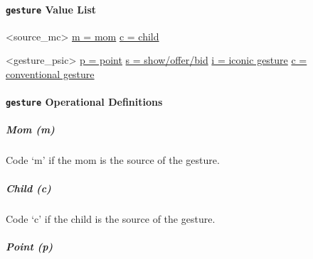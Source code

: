 \documentclass[
  12pt,
]{book}
\begin{document}
\hypertarget{gesture_value_list}{%
\paragraph*{\texorpdfstring{\texttt{gesture} Value List}{gesture Value List}}\label{gesture_value_list}}

\textless source\_mc\textgreater{}
\protect\hyperlink{mom}{m = mom}
\protect\hyperlink{child}{c = child}

\textless gesture\_psic\textgreater{}
\protect\hyperlink{point}{p = point}
\protect\hyperlink{show_offer_bid}{s = show/offer/bid}
\protect\hyperlink{iconic_gesture}{i = iconic gesture}
\protect\hyperlink{conventional_gesture}{c = conventional gesture}

\hypertarget{gesture-operational-definitions}{%
\paragraph*{\texorpdfstring{\texttt{gesture} Operational Definitions}{gesture Operational Definitions}}\label{gesture-operational-definitions}}

\hypertarget{mom}{%
\subparagraph*{Mom (m)}\label{mom}}

Code `m' if the mom is the source of the gesture.

\hypertarget{child}{%
\subparagraph*{Child (c)}\label{child}}

Code `c' if the child is the source of the gesture.

\hypertarget{point}{%
\subparagraph*{Point (p)}\label{point}}
\end{document}
